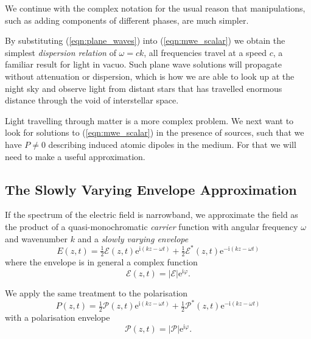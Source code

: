     We continue with the complex notation for the usual reason that
    manipulations, such as adding components of different phases, are much
    simpler.

    By substituting (\ref{eqn:plane_waves}) into (\ref{eqn:mwe_scalar}) we
    obtain the simplest \textit{dispersion relation} of $\omega = c k$, \ie all
    frequencies travel at a speed $c$, a familiar result for light in vacuo.
    Such plane wave solutions will propagate without attenuation or dispersion,
    which is how we are able to look up at the night sky and observe light from
    distant stars that has travelled enormous distance through the void of
    interstellar space.

    Light travelling through matter is a more complex problem. We next want to
    look for solutions to (\ref{eqn:mwe_scalar}) in the presence of sources,
    such that we have $P \ne 0$ describing induced atomic dipoles in the medium.
    For that we will need to make a useful approximation.

  \subsection{The Slowly Varying Envelope Approximation}

    If the spectrum of the electric field is narrowband, we approximate the
    field as the product of a quasi-monochromatic \textit{carrier} function with
    angular frequency $\omega$ and wavenumber $k$ and a \textit{slowly varying
    envelope}
    \begin{equation}
      E(z,t) = \tfrac{1}{2} \mathcal{E}(z,t) 
                    \mathrm{e}^{\mathrm{i}(k z - \omega t)} 
                + \tfrac{1}{2} \mathcal{E}^*(z,t) 
                    \mathrm{e}^{-\mathrm{i}(k z - \omega t)}
    \label{eqn:envelope_carrier_ansatz}
    \end{equation}
    where the envelope is in general a complex function 
    \begin{equation}
      \mathcal{E}(z,t) = \lvert \mathcal{E} \rvert 
                            \mathrm{e}^{\mathrm{i} \varphi}.
    \end{equation}
    
    We apply the same treatment to the polarisation
    \begin{equation}
      P(z,t) = \tfrac{1}{2} \mathcal{P}(z,t) 
                    \mathrm{e}^{\mathrm{i}(k z - \omega t)} 
                + \tfrac{1}{2} \mathcal{P}^*(z,t) 
                    \mathrm{e}^{-\mathrm{i}(k z - \omega t)}
    \end{equation}
    with a polarisation envelope
    \begin{equation}
      \mathcal{P}(z,t) = \lvert \mathcal{P} \rvert 
                            \mathrm{e}^{\mathrm{i} \varphi}.
    \end{equation}

